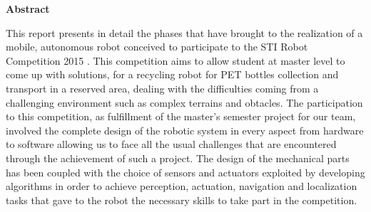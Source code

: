 %
%   
%







\clearpage
  \begin{deckblatt}
  \end{deckblatt}



\begin{center}
\bfseries
Abstract
\normalfont
\end{center}
This report presents in detail the phases that have brought to the realization of a mobile, autonomous robot conceived to participate to the STI Robot Competition 2015 . This competition aims to allow student at master level to come up with solutions, for a recycling robot for PET bottles collection and transport in a reserved area, dealing with the difficulties coming from a challenging environment such as complex terrains and obtacles. The participation to this competition, as fulfillment of the master’s semester project for our team, involved the complete design of the robotic system in every aspect from hardware to software allowing us to face all the usual challenges that are encountered through the achievement of such a project. The design of the mechanical parts has been coupled with the choice of sensors and actuators exploited by developing algorithms in order to achieve perception, actuation, navigation and localization tasks that gave to the robot the necessary skills to take part in the competition.

\clearpage

\tableofcontents

\clearpage


